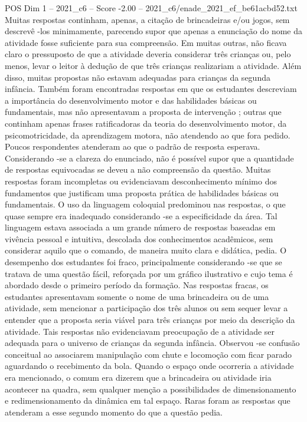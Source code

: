 \begin{textsample}{POS Dim 1 – 2021\_c6 – Score -2.00 – 2021\_c6/enade\_2021\_ef\_be61acbd52.txt}
Muitas respostas continham, apenas, a citação de brincadeiras e/ou jogos, sem descrevê -los minimamente, parecendo supor que apenas a enunciação do nome da atividade fosse suficiente para sua compreensão.
Em muitas outras, não ficava claro o pressuposto de que a atividade deveria considerar três crianças ou, pelo menos, levar o leitor à dedução de que três crianças realizariam a atividade.
Além disso, muitas propostas não estavam adequadas para crianças da segunda infância.
Também foram encontradas respostas em que os estudantes descreviam a importância do desenvolvimento motor e das habilidades básicas ou fundamentais, mas não apresentavam a proposta de intervenção ; outras que continham apenas frases ratificadoras da teoria do desenvolvimento motor, da psicomotricidade, da aprendizagem motora, não atendendo ao que fora pedido.
Poucos respondentes atenderam ao que o padrão de resposta esperava.
Considerando -se a clareza do enunciado, não é possível supor que a quantidade de respostas equivocadas se deveu a não compreensão da questão.
Muitas respostas foram incompletas ou evidenciavam desconhecimento mínimo dos fundamentos que justificam uma proposta prática de habilidades básicas ou fundamentais.
O uso da linguagem coloquial predominou nas respostas, o que quase sempre era inadequado considerando -se a especificidade da área.
Tal linguagem estava associada a um grande número de respostas baseadas em vivência pessoal e intuitiva, descolada dos conhecimentos acadêmicos, sem considerar aquilo que o comando, de maneira muito clara e didática, pedia.
O desempenho dos estudantes foi fraco, principalmente considerando -se que se tratava de uma questão fácil, reforçada por um gráfico ilustrativo e cujo tema é abordado desde o primeiro período da formação.
Nas respostas fracas, os estudantes apresentavam somente o nome de uma brincadeira ou de uma atividade, sem mencionar a participação dos três alunos ou sem sequer levar a entender que a proposta seria viável para três crianças por meio da descrição da atividade.
Tais respostas não evidenciavam preocupação de a atividade ser adequada para o universo de crianças da segunda infância.
Observou -se confusão conceitual ao associarem manipulação com chute e locomoção com ficar parado aguardando o recebimento da bola.
Quando o espaço onde ocorreria a atividade era mencionado, o comum era dizerem que a brincadeira ou atividade iria acontecer na quadra, sem qualquer menção a possibilidades de dimensionamento e redimensionamento da dinâmica em tal espaço.
Raras foram as respostas que atenderam a esse segundo momento do que a questão pedia.

\end{textsample}
